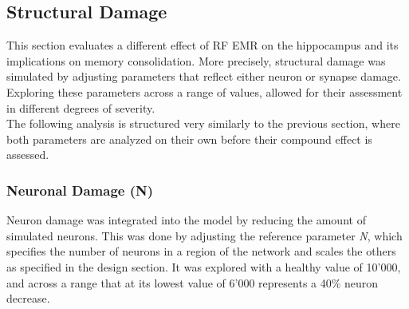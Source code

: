         
    \subsection{Structural Damage}
    This section evaluates a different effect of RF EMR on the hippocampus and its implications on memory consolidation. More precisely, structural damage was simulated by adjusting parameters that reflect either neuron or synapse damage. Exploring these parameters across a range of values, allowed for their assessment in different degrees of severity.\\
    The following analysis is structured very similarly to the previous section, where both parameters are analyzed on their own before their compound effect is assessed.

    
        \subsubsection{Neuronal Damage (N)}
        Neuron damage was integrated into the model by reducing the amount of simulated neurons. This was done by adjusting the reference parameter \textit{N}, which specifies the number of neurons in a region of the network and scales the others as specified in the design section. It was explored with a healthy value of 10'000, and across a range that at its lowest value of 6'000 represents a 40\% neuron decrease.

